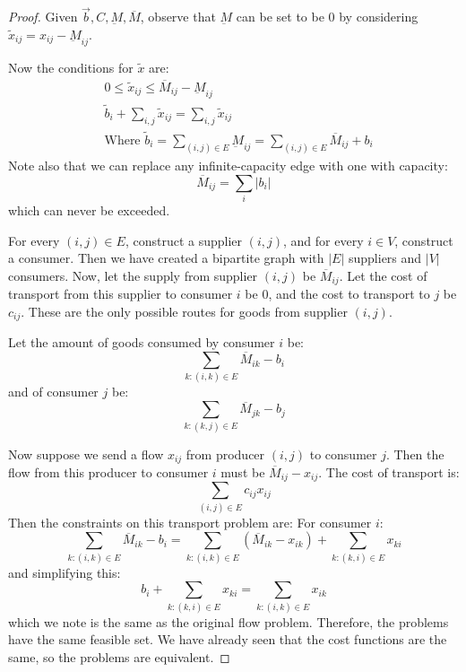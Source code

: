 \documentclass[../Main.tex]{subfiles}
\begin{document}
\begin{proof}
    Given $\vec{b}, C, \underbar{M}, \overline{M}$, observe that $\underbar{M}$ can be set to be $0$ by considering $\tilde{x}_{ij} = x_{ij} - \underbar{M}_{ij}$.

    Now the conditions for $\tilde{x}$ are:
    \begin{align*}
        &0 \leq \tilde{x}_{ij} \leq \overline{M}_{ij} - \underbar{M}_{ij} \\
        &\tilde{b}_i + \sum_{i, j} \tilde{x}_{ij} = \sum_{i, j} \tilde{x}_{ij} \\
        &\text{Where } \tilde{b}_i = \sum_{(i, j) \in E} \underbar{M}_{ij} = \sum_{(i, j) \in E} \overline{M}_{ij} + b_i
    \end{align*}
    Note also that we can replace any infinite-capacity edge with one with capacity:
    \begin{equation*}
        \overline{M}_{ij} = \sum_i |b_i|
    \end{equation*}
    which can never be exceeded.

    For every $(i, j) \in E$, construct a supplier $(i, j)$, and for every $i \in V$, construct a consumer. Then we have created a bipartite graph with $|E|$ suppliers and $|V|$ consumers. Now, let the supply from supplier $(i, j)$ be $\overline{M}_{ij}$. Let the cost of transport from this supplier to consumer $i$ be 0, and the cost to transport to $j$ be $c_{ij}$. These are the only possible routes for goods from supplier $(i, j)$.
    
    Let the amount of goods consumed by consumer $i$ be:
    \begin{equation*}
        \sum_{k : (i, k) \in E} \overline{M}_{ik} - b_i
    \end{equation*}
    and of consumer $j$ be:
    \begin{equation*}
        \sum_{k : (k, j) \in E} \overline{M}_{jk} - b_j
    \end{equation*}

    Now suppose we send a flow $x_{ij}$ from producer $(i, j)$ to consumer $j$. Then the flow from this producer to consumer $i$ must be $\overline{M}_{ij} - x_{ij}$. The cost of transport is:
    \begin{equation*}
        \sum_{(i, j) \in E} c_{ij} x_{ij}
    \end{equation*}
    Then the constraints on this transport problem are:
    For consumer $i$:
    \begin{equation*}
        \sum_{k : (i, k) \in E} \overline{M}_{ik} - b_i = \sum_{k : (i, k) \in E} (\overline{M}_{ik} - x_{ik}) + \sum_{k : (k, i) \in E} x_{ki}
    \end{equation*}
    and simplifying this:
    \begin{equation*}
        b_i + \sum_{k : (k, i) \in E} x_{ki} = \sum_{k : (i, k) \in E} x_{ik}
    \end{equation*}
    which we note is the same as the original flow problem. Therefore, the problems have the same feasible set. We have already seen that the cost functions are the same, so the problems are equivalent.
\end{proof}
\end{document}
